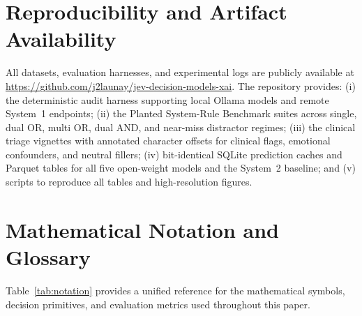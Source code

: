 \documentclass[10pt]{article}
\begin{document}
\section*{Reproducibility and Artifact Availability}
All datasets, evaluation harnesses, and experimental logs are publicly available at \url{https://github.com/j2launay/jev-decision-models-xai}.
The repository provides:
(i) the deterministic audit harness supporting local Ollama models and remote System~1 endpoints;
(ii) the Planted System-Rule Benchmark suites across single, dual OR, multi OR, dual AND, and near-miss distractor regimes;
(iii) the clinical triage vignettes with annotated character offsets for clinical flags, emotional confounders, and neutral fillers;
(iv) bit-identical SQLite prediction caches and Parquet tables for all five open-weight models and the System~2 baseline; and
(v) scripts to reproduce all tables and high-resolution figures.

\clearpage



\clearpage
\appendix
\section{Mathematical Notation and Glossary}
\label{sec:notation}

Table~\ref{tab:notation} provides a unified reference for the mathematical symbols, decision primitives, and evaluation metrics used throughout this paper.
\end{document}
